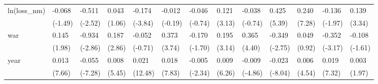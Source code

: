 \begin{tabular}{p{1.5cm} p{1.7cm} p{1.7cm} p{1.7cm} p{1.7cm} p{1.7cm} p{1.7cm} p{1.7cm} p{1.7cm} p{1.7cm} p{1.7cm} p{1.7cm} p{1.7cm}}
\hline
ln(loss\_nm)     &   -0.068         &   -0.511\sym{*}  &    0.043         &   -0.174\sym{***}&   -0.012         &   -0.046         &    0.121\sym{**} &   -0.038         &    0.425\sym{***}&    0.240\sym{***}&   -0.136         &    0.139\sym{**} \\
                &  (-1.49)         &  (-2.52)         &   (1.06)         &  (-3.84)         &  (-0.19)         &  (-0.74)         &   (3.13)         &  (-0.74)         &   (5.39)         &   (7.28)         &  (-1.97)         &   (3.34)         \\
war             &    0.145         &   -0.934\sym{**} &    0.187\sym{**} &   -0.052         &    0.373\sym{***}&   -0.170         &    0.195\sym{**} &    0.365\sym{***}&   -0.349\sym{**} &    0.049         &   -0.352\sym{**} &   -0.108         \\
                &   (1.98)         &  (-2.86)         &   (2.86)         &  (-0.71)         &   (3.74)         &  (-1.70)         &   (3.14)         &   (4.40)         &  (-2.75)         &   (0.92)         &  (-3.17)         &  (-1.61)         \\
year            &    0.013\sym{***}&   -0.055\sym{***}&    0.008\sym{***}&    0.021\sym{***}&    0.018\sym{***}&   -0.005\sym{*}  &    0.009\sym{***}&   -0.009\sym{***}&   -0.023\sym{***}&    0.006\sym{***}&    0.019\sym{***}&    0.003         \\
                &   (7.66)         &  (-7.28)         &   (5.45)         &  (12.48)         &   (7.83)         &  (-2.34)         &   (6.26)         &  (-4.86)         &  (-8.04)         &   (4.54)         &   (7.32)         &   (1.97)         \\
\end{tabular}
